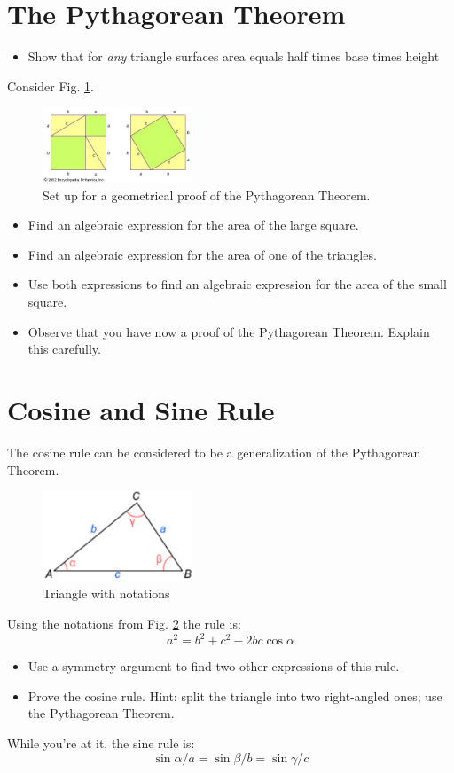 \documentclass[a4wide]{article}
\begin{document}
\section*{The Pythagorean Theorem}
\begin{itemize}
  \item Show that for \emph{any} triangle surfaces area equals half times base times height
\end{itemize}
Consider Fig. \ref{fig-pyth}. 
\begin{figure}[h]
  \begin{center}
\includegraphics[width=0.4\textwidth]{pyth.jpg}
  \end{center}
  \caption{Set up for a geometrical proof of the Pythagorean Theorem.}
  \label{fig-pyth}
\end{figure}
\begin{itemize}
  \item Find an algebraic expression for the area of the large square.
  \item Find an algebraic expression for the area of one of the triangles.
  \item  Use both expressions to find an algebraic expression for the area of the small square.
  \item Observe that you have now a proof of the Pythagorean Theorem. Explain this carefully.
\end{itemize}

\section*{Cosine and Sine Rule}
The cosine rule can be considered to be a generalization of the Pythagorean Theorem.
\begin{figure}[h]
  \begin{center}
\includegraphics[width=0.4\textwidth]{Triangle_with_notations_2.pdf}
  \end{center}
  \caption{Triangle with notations}
  \label{fig-tri}
\end{figure}
Using the notations from Fig. \ref{fig-tri} the rule is:
$$
a ^2 = b^2 + c^2 - 2bc \cos \alpha
$$
\begin{itemize}
\item Use a symmetry argument to find two other expressions of this rule.
\item Prove the cosine rule. Hint: split the triangle into two right-angled ones; use the Pythagorean Theorem.
\end{itemize}
While you're at it, the sine rule is:
$$
  \sin \alpha/a = \sin \beta/b = \sin \gamma/c
$$
\end{document}
